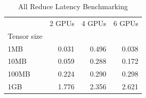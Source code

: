 \begin{table}
\caption{All Reduce Latency Benchmarking}
\label{tab:all_reduce_latency}
\begin{tabular}{lrrr}
\toprule
 & 2 GPUs & 4 GPUs & 6 GPUs \\
Tensor size &  &  &  \\
\midrule
1MB & 0.031 & 0.496 & 0.038 \\
10MB & 0.059 & 0.288 & 0.172 \\
100MB & 0.224 & 0.290 & 0.298 \\
1GB & 1.776 & 2.356 & 2.621 \\
\bottomrule
\end{tabular}
\end{table}
